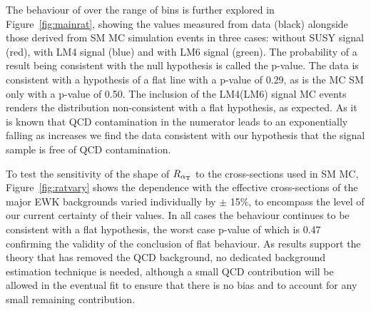 The behaviour of \RaT over the range of \HT bins is further explored in Figure~\ref{fig:mainrat}, showing the values measured from data (black) alongside those derived from SM MC simulation events in three cases: without SUSY signal (red), with LM4 signal (blue) and with LM6 signal (green). The probability of a result being consistent with the null hypothesis is called the p-value. The data is consistent with a hypothesis of a flat line with a p-value of 0.29, as is the MC SM only with a p-value of 0.50. The inclusion of the LM4(LM6) signal MC events renders the distribution non-consistent with a flat hypothesis, as expected. As it is known that QCD contamination in the numerator leads to an exponentially falling \RaT as \HT increases we find the data consistent with our hypothesis that the signal sample is free of QCD contamination.

To test the sensitivity of the shape of $R_{\alpha_{\text{T}}}$ to the cross-sections used in SM MC, Figure~\ref{fig:ratvary} shows the \HT dependence with the effective cross-sections of the major EWK backgrounds varied individually by $\pm$ 15\%, to encompass the level of our current certainty of their values. In all cases the behaviour continues to be consistent with a flat hypothesis, the worst case p-value of which is 0.47 confirming the validity of the conclusion of flat behaviour. As results support the theory that \alt has removed the QCD background, no dedicated background estimation technique is needed, although a small QCD contribution will be allowed in the eventual fit to ensure that there is no bias and to account for any small remaining contribution. 

